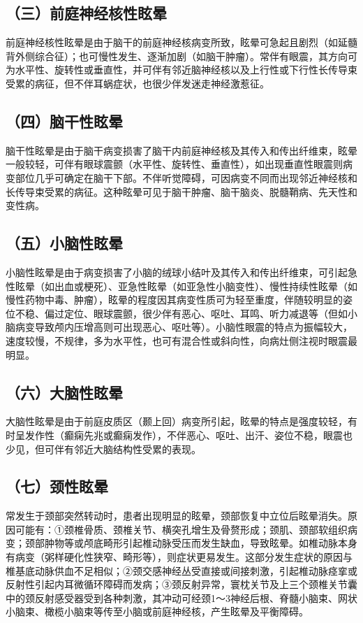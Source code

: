 \subsection{（三）前庭神经核性眩晕}

前庭神经核性眩晕是由于脑干的前庭神经核病变所致，眩晕可急起且剧烈（如延髓背外侧综合征）；也可慢性发生、逐渐加剧（如脑干肿瘤）。常伴有眼震，其方向可为水平性、旋转性或垂直性，并可伴有邻近脑神经核以及上行性或下行性长传导束受累的病征，但不伴耳蜗症状，也很少伴发迷走神经激惹征。

\subsection{（四）脑干性眩晕}

脑干性眩晕是由于脑干病变损害了脑干内前庭神经核及其传入和传出纤维束，眩晕一般较轻，可伴有眼球震颤（水平性、旋转性、垂直性），如出现垂直性眼震则病变部位几乎可确定在脑干下部。不伴听觉障碍，可因病变不同而出现邻近神经核和长传导束受累的病征。这种眩晕可见于脑干肿瘤、脑干脑炎、脱髓鞘病、先天性和变性病。

\subsection{（五）小脑性眩晕}

小脑性眩晕是由于病变损害了小脑的绒球小结叶及其传入和传出纤维束，可引起急性眩晕（如出血或梗死）、亚急性眩晕（如亚急性小脑变性）、慢性持续性眩晕（如慢性药物中毒、肿瘤），眩晕的程度因其病变性质可为轻至重度，伴随较明显的姿位不稳、偏过定位、眼球震颤，很少伴有恶心、呕吐、耳鸣、听力减退等（但如小脑病变导致颅内压增高则可出现恶心、呕吐等）。小脑性眼震的特点为振幅较大，速度较慢，不规律，多为水平性，也可有混合性或斜向性，向病灶侧注视时眼震最明显。

\subsection{（六）大脑性眩晕}

大脑性眩晕是由于前庭皮质区（颞上回）病变所引起，眩晕的特点是强度较轻，有时呈发作性（癫痫先兆或癫痫发作），不伴恶心、呕吐、出汗、姿位不稳，眼震也少见，但可伴有邻近大脑结构性受累的表现。

\subsection{（七）颈性眩晕}

常发生于颈部突然转动时，患者出现明显的眩晕，颈部恢复中立位后眩晕消失。原因可能有：①颈椎骨质、颈椎关节、横突孔增生及骨赘形成；颈肌、颈部软组织病变；颈部肿物等或颅底畸形引起椎动脉受压而发生缺血，导致眩晕。如椎动脉本身有病变（粥样硬化性狭窄、畸形等），则症状更易发生。这部分发生症状的原因与椎基底动脉供血不足相似；②颈交感神经丛受直接或间接刺激，引起椎动脉痉挛或反射性引起内耳微循环障碍而发病；③颈反射异常，寰枕关节及上三个颈椎关节囊中的颈反射感受器受到各种刺激，其冲动可经颈1～3神经后根、脊髓小脑束、网状小脑束、橄榄小脑束等传至小脑或前庭神经核，产生眩晕及平衡障碍。


